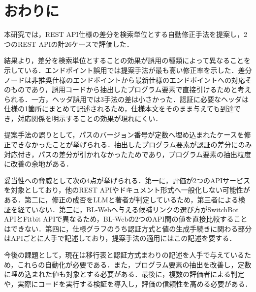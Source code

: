 \section{おわりに}
本研究では，REST API仕様の差分を検索単位とする自動修正手法を提案し，2つのREST APIの計26ケースで評価した．

結果より，差分を検索単位とすることの効果が誤用の種類によって異なることを示している．エンドポイント誤用では提案手法が最も高い修正率を示した．差分ノードは非推奨仕様のエンドポイントから最新仕様のエンドポイントへの対応そのものであり，誤用コードから抽出したプログラム要素で直接引けるためと考えられる．一方，ヘッダ誤用では3手法の差は小さかった．認証に必要なヘッダは仕様の1箇所にまとめて記述されるため，仕様本文をそのまま与えても到達でき，対応関係を明示することの効果が現れにくい．

提案手法の誤りとして，パスのバージョン番号が定数へ埋め込まれたケースを修正できなかったことが挙げられる．抽出したプログラム要素が認証の差分にのみ対応付き，パスの差分が引かれなかったためであり，プログラム要素の抽出粒度に改善の余地がある．

妥当性への脅威として次の4点が挙げられる．第一に，評価が2つのAPIサービスを対象としており，他のREST APIやドキュメント形式へ一般化しない可能性がある．第二に，修正の成否をLLMと著者が判定しているため，第三者による検証を経ていない．第三に，BL-Webへ与える候補リンクの選び方がSwitchBot APIとFitbit APIで異なるため，BL-Webの2つのAPI間の値を直接比較することはできない．第四に，仕様グラフのうち認証方式と値の生成手続きに関わる部分はAPIごとに人手で記述しており，提案手法の適用にはこの記述を要する．

今後の課題として，現在は移行表と認証方式まわりの記述を人手で与えているため，これらの自動化が必要である．また，プログラム要素の抽出を改善し，定数に埋め込まれた値も対象とする必要がある．最後に，複数の評価者による判定や，実際にコードを実行する検証を導入し，評価の信頼性を高める必要がある．
